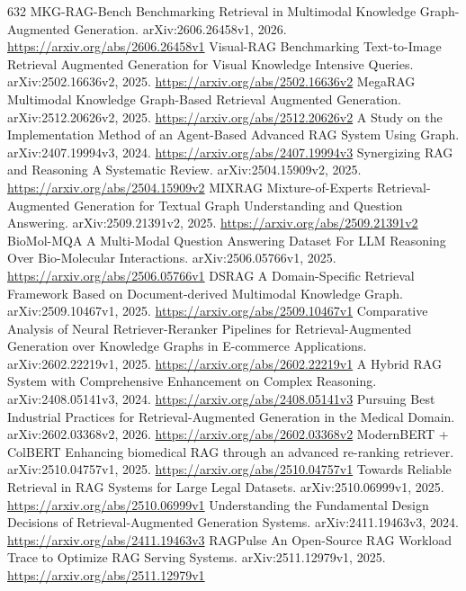 \documentclass[11pt]{article}
\begin{document}
\begin{thebibliography}{632}
 MKG-RAG-Bench Benchmarking Retrieval in Multimodal Knowledge Graph-Augmented Generation. arXiv:2606.26458v1, 2026. \url{https://arxiv.org/abs/2606.26458v1}
 Visual-RAG Benchmarking Text-to-Image Retrieval Augmented Generation for Visual Knowledge Intensive Queries. arXiv:2502.16636v2, 2025. \url{https://arxiv.org/abs/2502.16636v2}
 MegaRAG Multimodal Knowledge Graph-Based Retrieval Augmented Generation. arXiv:2512.20626v2, 2025. \url{https://arxiv.org/abs/2512.20626v2}
 A Study on the Implementation Method of an Agent-Based Advanced RAG System Using Graph. arXiv:2407.19994v3, 2024. \url{https://arxiv.org/abs/2407.19994v3}
 Synergizing RAG and Reasoning A Systematic Review. arXiv:2504.15909v2, 2025. \url{https://arxiv.org/abs/2504.15909v2}
 MIXRAG Mixture-of-Experts Retrieval-Augmented Generation for Textual Graph Understanding and Question Answering. arXiv:2509.21391v2, 2025. \url{https://arxiv.org/abs/2509.21391v2}
 BioMol-MQA A Multi-Modal Question Answering Dataset For LLM Reasoning Over Bio-Molecular Interactions. arXiv:2506.05766v1, 2025. \url{https://arxiv.org/abs/2506.05766v1}
 DSRAG A Domain-Specific Retrieval Framework Based on Document-derived Multimodal Knowledge Graph. arXiv:2509.10467v1, 2025. \url{https://arxiv.org/abs/2509.10467v1}
 Comparative Analysis of Neural Retriever-Reranker Pipelines for Retrieval-Augmented Generation over Knowledge Graphs in E-commerce Applications. arXiv:2602.22219v1, 2025. \url{https://arxiv.org/abs/2602.22219v1}
 A Hybrid RAG System with Comprehensive Enhancement on Complex Reasoning. arXiv:2408.05141v3, 2024. \url{https://arxiv.org/abs/2408.05141v3}
 Pursuing Best Industrial Practices for Retrieval-Augmented Generation in the Medical Domain. arXiv:2602.03368v2, 2026. \url{https://arxiv.org/abs/2602.03368v2}
 ModernBERT + ColBERT Enhancing biomedical RAG through an advanced re-ranking retriever. arXiv:2510.04757v1, 2025. \url{https://arxiv.org/abs/2510.04757v1}
 Towards Reliable Retrieval in RAG Systems for Large Legal Datasets. arXiv:2510.06999v1, 2025. \url{https://arxiv.org/abs/2510.06999v1}
 Understanding the Fundamental Design Decisions of Retrieval-Augmented Generation Systems. arXiv:2411.19463v3, 2024. \url{https://arxiv.org/abs/2411.19463v3}
 RAGPulse An Open-Source RAG Workload Trace to Optimize RAG Serving Systems. arXiv:2511.12979v1, 2025. \url{https://arxiv.org/abs/2511.12979v1}

\end{thebibliography}
\end{document}
